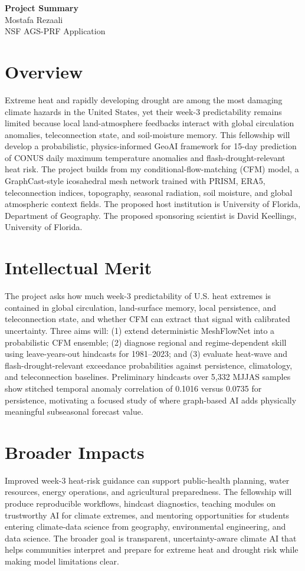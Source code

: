 \documentclass[11pt,letterpaper]{article}
\begin{document}
\begin{center}
{\Large\bfseries Project Summary}\\[0.05in]
{\normalsize Mostafa Rezaali}\\
{\normalsize NSF AGS-PRF Application}
\end{center}
\vspace{-0.08in}
\section*{Overview}
Extreme heat and rapidly developing drought are among the most damaging climate hazards in the United States, yet their week-3 predictability remains limited because local land-atmosphere feedbacks interact with global circulation anomalies, teleconnection state, and soil-moisture memory. This fellowship will develop a probabilistic, physics-informed GeoAI framework for 15-day prediction of CONUS daily maximum temperature anomalies and flash-drought-relevant heat risk. The project builds from my conditional-flow-matching (CFM) model, a GraphCast-style icosahedral mesh network trained with PRISM, ERA5, teleconnection indices, topography, seasonal radiation, soil moisture, and global atmospheric context fields. The proposed host institution is University of Florida, Department of Geography. The proposed sponsoring scientist is David Keellings, University of Florida.

\section*{Intellectual Merit}
The project asks how much week-3 predictability of U.S. heat extremes is contained in global circulation, land-surface memory, local persistence, and teleconnection state, and whether CFM can extract that signal with calibrated uncertainty. Three aims will: (1) extend deterministic MeshFlowNet into a probabilistic CFM ensemble; (2) diagnose regional and regime-dependent skill using leave-years-out hindcasts for 1981--2023; and (3) evaluate heat-wave and flash-drought-relevant exceedance probabilities against persistence, climatology, and teleconnection baselines. Preliminary hindcasts over 5,332 MJJAS samples show stitched temporal anomaly correlation of 0.1016 versus 0.0735 for persistence, motivating a focused study of where graph-based AI adds physically meaningful subseasonal forecast value.

\section*{Broader Impacts}
Improved week-3 heat-risk guidance can support public-health planning, water resources, energy operations, and agricultural preparedness. The fellowship will produce reproducible workflows, hindcast diagnostics, teaching modules on trustworthy AI for climate extremes, and mentoring opportunities for students entering climate-data science from geography, environmental engineering, and data science. The broader goal is transparent, uncertainty-aware climate AI that helps communities interpret and prepare for extreme heat and drought risk while making model limitations clear.
\end{document}
